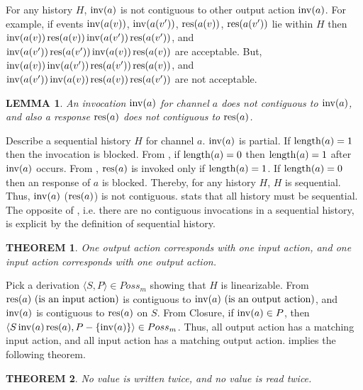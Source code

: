 \documentclass[12pt,a4paper,titlepage]{article}
\makeatletter
\newenvironment{proof}[1][\proofname]{\par
  \normalfont
  \topsep6\p@\@plus6\p@ \trivlist
  \item[\hskip\labelsep{\bfseries #1}\@addpunct{\bfseries.}]\ignorespaces
}{%
  \endtrivlist
}
\newcommand{\proofname}{Proof Sketch}
\theoremstyle{break}
\newtheorem{theorem}{THEOREM}[section]
\newtheorem{lemma}{LEMMA}[section]
\makeatother
\begin{document}
For any history $H$, \(\mathop{\mathrm{inv}}\nolimits(a)\) is not contiguous to other output action \(\mathop{\mathrm{inv}}\nolimits(a)\).
For example, if events \(\mathop{\mathrm{inv}}\nolimits(a(v))\), \(\mathop{\mathrm{inv}}\nolimits(a(v'))\), \(\mathop{\mathrm{res}}\nolimits(a(v))\), \(\mathop{\mathrm{res}}\nolimits(a(v'))\) lie within $H$ then 
\(\inv(a(v))\res(a(v))\inv(a(v'))\linebreak\res(a(v'))\), and \(\mathop{\mathrm{inv}}\nolimits(a(v'))\mathop{\mathrm{res}}\nolimits(a(v'))\mathop{\mathrm{inv}}\nolimits(a(v))\mathop{\mathrm{res}}\nolimits(a(v))\) are acceptable.
But, \(\inv(a(v))\inv(a(v'))\linebreak\res(a(v'))\res(a(v))\), and \(\mathop{\mathrm{inv}}\nolimits(a(v'))\mathop{\mathrm{inv}}\nolimits(a(v))\mathop{\mathrm{res}}\nolimits(a(v))\mathop{\mathrm{res}}\nolimits(a(v'))\) are not acceptable.
  \begin{lemma}\label{lm:seq}
An invocation \(\mathop{\mathrm{inv}}\nolimits(a)\) for channel $a$ does not contiguous to \(\mathop{\mathrm{inv}}\nolimits(a)\), and also a response \(\mathop{\mathrm{res}}\nolimits(a)\) does not contiguous to \(\mathop{\mathrm{res}}\nolimits(a)\).
  \end{lemma}
  \begin{proof}
Describe a sequential history $H$ for channel $a$.
\(\mathop{\mathrm{inv}}\nolimits(a)\) is partial.
If \(\mathop{\mathrm{length}}\nolimits(a)=1\) then the invocation is blocked.
From , if \(\mathop{\mathrm{length}}\nolimits(a)=0\) then \(\mathop{\mathrm{length}}\nolimits(a)=1\) after \(\mathop{\mathrm{inv}}\nolimits(a)\) occurs.
From , \(\mathop{\mathrm{res}}\nolimits(a)\) is invoked only if \(\mathop{\mathrm{length}}\nolimits(a)=1\).
If \(\mathop{\mathrm{length}}\nolimits(a)=0\) then an response of \(a\) is blocked.
Thereby, for any history $H$, $H$ is sequential.
Thus, \(\mathop{\mathrm{inv}}\nolimits(a)\) (\(\mathop{\mathrm{res}}\nolimits(a)\)) is not contiguous.
\QED
  \end{proof}
 stats that all history must be sequential.
The opposite of , i.e. there are no contiguous invocations in a sequential history, is explicit by the definition of sequential history.
  \begin{theorem}\label{th:onetoone}
One output action corresponds with one input action, and one input action corresponds with one output action.
  \end{theorem}
  \begin{proof}
Pick a derivation \(\langle S,P\rangle\in Poss_m\) showing that $H$ is linearizable.
From  \(\mathop{\mathrm{res}}\nolimits(a)\mbox{ (is an input action)}\) is contiguous to \(\mathop{\mathrm{inv}}\nolimits(a)\mbox{ (is an output action)}\), and \(\mathop{\mathrm{inv}}\nolimits(a)\) is contiguous to \(\mathop{\mathrm{res}}\nolimits(a)\) on $S$.
From  Closure, if \(\mathop{\mathrm{inv}}\nolimits(a)\in P\), then \(\langle S\mathop{\mathrm{inv}}\nolimits(a)\mathop{\mathrm{res}}\nolimits(a), P-\{\mathop{\mathrm{inv}}\nolimits(a)\}\rangle\in Poss_m\).
Thus, all output action has a matching input action, and all input action has a matching output action.
\QED
  \end{proof}
 implies the following theorem.
  \begin{theorem}
No value is written twice, and no value is read twice.
  \end{theorem}
\end{document}

